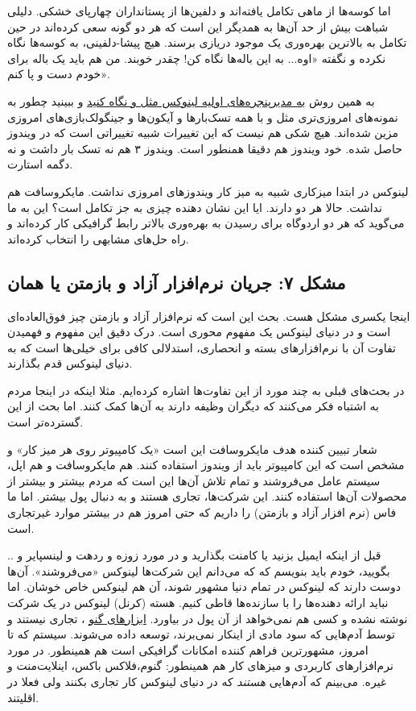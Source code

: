 اما کوسه‌ها از ماهی تکامل یافته‌اند و دلفین‌ها از پستانداران چهارپای خشکی. دلیلی شباهت بیش از حد آن‌ها به همدیگر این است که هر دو گونه سعی کرده‌اند در حین تکامل به بالاترین بهره‌وری یک موجود دریازی برسند. هیچ پیشا-دلفینی، به کوسه‌ها نگاه نکرده و نگفته «اوه... به این باله‌ها نگاه کن! چقدر خوبند. من هم باید یک باله برای خودم دست و پا کنم».

به همین روش
\href{http://xwinman.org/}{به مدیرپنجره‌های اولیه لینوکس مثل 
 و 
 نگاه کنید}
و ببینید چطور به نمونه‌های امروزی‌تری مثل 
 و 
 با همه تسک‌بارها و آیکون‌ها و جینگولک‌بازی‌های امروزی مزین شده‌اند. هیچ شکی هم نیست که این تغییرات شبیه تغییراتی است که در ویندوز حاصل شده. خود ویندوز هم دقیقا همنطور است. ویندوز ۳ هم نه تسک بار داشت و نه دگمه استارت.



لینوکس در ابتدا میزکاری شبیه به میز کار ویندوزهای امروزی نداشت. مایکروسافت هم نداشت. حالا هر دو دارند. ایا این نشان دهنده چیزی به جز تکامل است؟‌
این به ما می‌گوید که هر دو اردوگاه برای رسیدن به بهره‌وری بالاتر رابط گرافیکی کار کرده‌اند و راه حل‌های مشابهی را انتخاب کرده‌اند.
\subsection*{مشکل ۷: جریان نرم‌افزار آزاد و بازمتن یا همان 
}
اینجا یکسری مشکل هست. بحث این است که نرم‌افزار آزاد و بازمتن چیز فوق‌العاده‌ای است و در دنیای لینوکس یک مفهوم محوری است. درک دقیق این مفهوم و فهمیدن تفاوت آن با نرم‌افزارهای بسته و انحصاری، استدلالی کافی برای خیلی‌ها است که به دنیای لینوکس قدم بگذارند.

در بحث‌های قبلی به چند مورد از این تفاوت‌ها اشاره کرده‌ایم. مثلا اینکه در اینجا مردم به اشتباه فکر می‌کنند که دیگران وظیفه دارند به آن‌ها کمک کنند. اما بحث از این گسترده‌تر است.

شعار تبیین کننده هدف مایکروسافت این است «یک کامپیوتر روی هر میز کار» و مشخص است که این کامپیوتر باید از ویندوز استفاده کنند. هم مایکروسافت و هم اپل، سیستم عامل می‌فروشند و تمام تلاش آن‌ها این است که مردم بیشتر و بیشتر از محصولات آن‌ها استفاده کنند. این شرکت‌ها، تجاری هستند و به دنبال پول بیشتر.
اما ما فاس (نرم افزار آزاد و بازمتن) را داریم که حتی امروز هم در بیشتر موارد غیرتجاری است.

قبل از اینکه ایمیل بزنید یا کامنت بگذارید و در مورد زوزه و ردهت و لینسپایر و .. بگویید، خودم باید بنویسم که که می‌دانم این شرکت‌ها لینوکس «می‌فروشند». آن‌ها دوست دارند که لینوکس در تمام دنیا مشهور شوند، آن هم لینوکس خاص خوشان. اما نباید ارائه دهنده‌ها را با سازنده‌ها قاطی کنیم. هسته (کرنل) لینوکس در یک شرکت نوشته نشده و کسی هم نمی‌خواهد از آن پول در بیاورد.
\href{http://www.gnu.org/home.fa.html}{ابزارهای گنو}
، تجاری نیستند و توسط آدم‌هایی که سود مادی از اینکار نمی‌برند، توسعه داده می‌شوند. سیستم 
 که تا امروز، مشهورترین فراهم کننده امکانات گرافیکی است هم همینطور. در مورد نرم‌افزارهای کاربردی و میزهای کار هم همینطور: گنوم،‌فلاکس باکس، اینلایت‌منت و غیره. می‌بینم که آدم‌هایی
\emph{هستند}
که در دنیای لینوکس کار تجاری بکنند ولی فعلا در اقلیتند.

